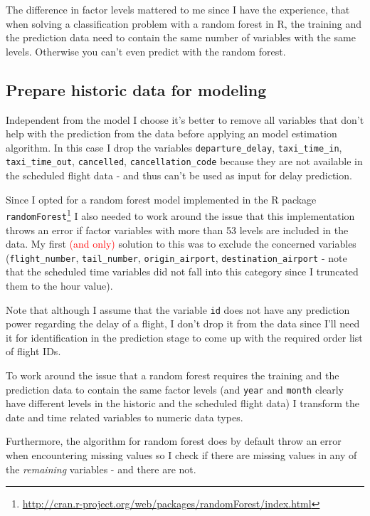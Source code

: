 \documentclass{article}
\begin{document}
The difference in factor levels mattered to me since I have the experience, that when solving a classification problem with a random forest in R, the training and the prediction data need to contain the same number of variables with the same levels. Otherwise you can't even predict with the random forest.


\subsection{Prepare historic data for modeling} %
\label{sub:prepare_historic_data_for_modeling}
Independent from the model I choose it's better to remove all variables that don't help with the prediction from the data before applying an model estimation algorithm. In this case I drop the variables \verb+departure_delay+, \verb+taxi_time_in+, \verb+taxi_time_out+, \verb+cancelled+, \verb+cancellation_code+ because they are not available in the scheduled flight data - and thus can't be used as input for delay prediction.

Since I opted for a random forest model implemented in the R package \verb+randomForest+\footnote{\url{http://cran.r-project.org/web/packages/randomForest/index.html}} I also needed to work around the issue that this implementation throws an error if factor variables with more than 53 levels are included in the data. My first \textcolor{red}{(and only)} solution to this was to exclude the concerned variables (\verb+flight_number+, \verb+tail_number+, \verb+origin_airport+, \verb+destination_airport+ - note that the scheduled time variables did not fall into this category since I truncated them to the hour value).

Note that although I assume that the variable \verb+id+ does not have any prediction power regarding the delay of a flight, I don't drop it from the data since I'll need it for identification in the prediction stage to come up with the required order list of flight IDs. 

To work around the issue that a random forest requires the training and the prediction data to contain the same factor levels (and \verb+year+ and \verb+month+ clearly have different levels in the historic and the scheduled flight data) I transform the date and time related variables to numeric data types.

Furthermore, the algorithm for random forest does by default throw an error when encountering missing values so I check if there are missing values in any of the \textit{remaining} variables - and there are not.
\end{document}
